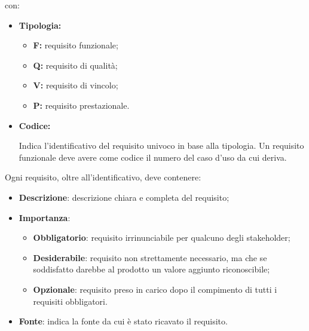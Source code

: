 con:
\begin{itemize}
    \item \textbf{Tipologia:}
          \begin{itemize}
              \item \textbf{F:} requisito funzionale;
              \item \textbf{Q:} requisito di qualità;
              \item \textbf{V:} requisito di vincolo;
              \item \textbf{P:} requisito prestazionale.
          \end{itemize}
    \item \textbf{Codice:}
          \par Indica l'identificativo del requisito univoco in base alla tipologia. Un
          requisito funzionale deve avere come codice il numero del caso d'uso da cui
          deriva.
\end{itemize}
Ogni requisito, oltre all'identificativo, deve contenere:
\begin{itemize}
    \item \textbf{Descrizione}: descrizione chiara e completa del requisito;
    \item \textbf{Importanza}:
          \begin{itemize}
              \item \textbf{Obbligatorio}: requisito irrinunciabile per qualcuno degli stakeholder;
              \item \textbf{Desiderabile}: requisito non strettamente necessario, ma che se soddisfatto darebbe al prodotto un valore aggiunto riconoscibile;
              \item \textbf{Opzionale}: requisito preso in carico dopo il compimento di tutti i requisiti obbligatori.
          \end{itemize}
    \item \textbf{Fonte}: indica la fonte da cui è stato ricavato il requisito.
\end{itemize}

